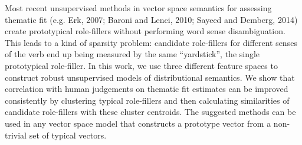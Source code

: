 Most recent unsupervised methods in vector space semantics for assessing thematic fit (e.g. Erk, 2007; Baroni and Lenci, 2010; Sayeed and Demberg, 2014) create prototypical role-fillers without performing word sense disambiguation.  This leads to a kind of sparsity problem: candidate role-fillers for different senses of the verb end up being measured by the same ``yardstick'', the single prototypical role-filler. In this work, we use three different feature spaces to construct robust unsupervised models of distributional semantics. We show that correlation with human judgements on thematic fit estimates can be improved consistently by clustering typical role-fillers and then calculating similarities of candidate role-fillers with these cluster centroids. The suggested methods can be used in any vector space model that constructs a prototype vector from a non-trivial set of typical vectors.
